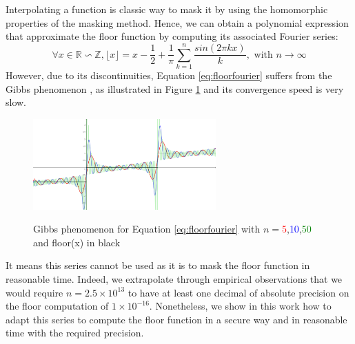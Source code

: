 \documentclass[runningheads]{llncs}
\begin{document}
Interpolating a function is classic way to mask it by using the homomorphic properties of the masking method. Hence, we can obtain a polynomial expression that approximate the floor function by computing its associated Fourier series:\begin{equation}\label{eq:floorfourier}
  \forall x \in \mathbb{R}\backsim \mathbb{Z}, \lfloor x\rfloor = x - \frac{1}{2} + \frac{1}{\pi}\sum_{k=1}^n \frac{sin(2\pi kx)}{k},\text{ with }n\rightarrow \infty
\end{equation}
However, due to its discontinuities, Equation \ref{eq:floorfourier} suffers from the Gibbs phenomenon \cite{8e44e918-40ae-3857-bb25-dc12ccf9e7c3}, as illustrated in Figure \ref{fig:gibbs} and its convergence speed is very slow. 
\begin{figure}[!ht]
  \centering
  \includegraphics[width=7cm]{figure/gibbsphenomenonsmall.png}
  \label{fig:gibbs}
  \caption{Gibbs phenomenon for Equation \ref{eq:floorfourier} with $n=$\textcolor{red}{5},\textcolor{blue}{10},\textcolor{green}{50} and floor(x) in black}
\end{figure}
It means this series cannot be used as it is to mask the floor function in reasonable time. Indeed, we extrapolate through empirical observations that we would require $n=\num{2.5}\times 10^{13}$ to have at least one decimal of absolute precision on the floor computation of $1\times 10^{-16}$. Nonetheless, we show in this work how to adapt this series to compute the floor function in a secure way and in reasonable time with the required precision.
%
\end{document}
